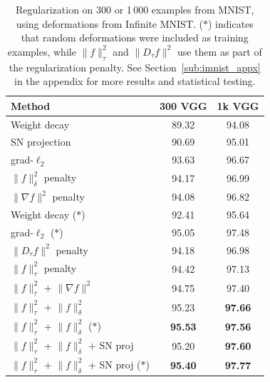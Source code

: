 \begin{table}[tb]
\caption{Regularization on 300 or 1\,000 examples from MNIST, using deformations from Infinite MNIST.
($\ast$) indicates that random deformations were included as training examples,
while $\|f\|_\tau^2$ and $\|D_\tau f\|^2$
use them as part of the regularization penalty. 
See Section~\ref{sub:imnist_appx} in the appendix for more results and statistical testing.
}

\label{tab:imnist}
\centering
\small
\vspace{0.2cm}
\begin{tabular}{ | l | c | c |  }
\hline
Method & 300 VGG & 1k VGG \\ \hline
\hline
Weight decay & 89.32 & 94.08 \\
SN projection & 90.69 & 95.01 \\
grad-$\ell_2$ & 93.63 & 96.67 \\
$\|f\|_\delta^2$ penalty & 94.17 & 96.99 \\
$\|\nabla f\|^2$ penalty & 94.08 & 96.82 \\
\hline
Weight decay ($\ast$) & 92.41 & 95.64 \\
grad-$\ell_2$ ($\ast$) & 95.05 & 97.48 \\
\hline
$\|D_\tau f\|^2$ penalty & 94.18 & 96.98 \\
$\|f\|_\tau^2$ penalty & 94.42 & 97.13 \\
$\|f\|_{\tau}^2$ + $\|\nabla f\|^2$ & 94.75 & 97.40 \\
$\|f\|_{\tau}^2$ + $\|f\|^2_\delta$ & 95.23 & \textbf{\color{darkgray}97.66} \\
$\|f\|_{\tau}^2$ + $\|f\|^2_\delta$ ($\ast$) & \textbf{95.53} & \textbf{\color{darkgray}97.56} \\
$\|f\|_{\tau}^2$ + $\|f\|^2_\delta$ + SN proj & 95.20 & \textbf{\color{darkgray}97.60} \\
$\|f\|_{\tau}^2$ + $\|f\|^2_\delta$ + SN proj ($\ast$) & \textbf{\color{darkgray}95.40} & \textbf{97.77} \\
\hline
\end{tabular}
\end{table}

\vspace*{-0.2cm}
